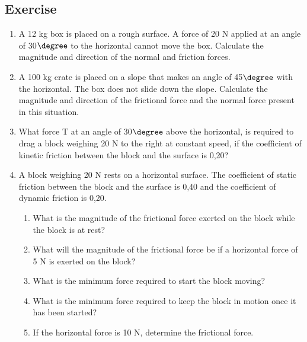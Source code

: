 \subsection{Exercise}
\begin{enumerate}
\item {A 12 kg box is placed on a rough surface. A force of 20 N applied at an angle of 30$\degree$ to the horizontal cannot move the box. Calculate the magnitude and direction of the normal and friction forces.}
\item {A 100 kg crate is placed on a slope that makes an angle of 45$\degree$ with the horizontal. The box does not slide down the slope. Calculate the magnitude and direction of the frictional force and the normal force present in this situation.}
\item {What force T at an angle of 30$\degree$ above the horizontal, is required to drag a block weighing 20 N to the right at constant speed, if the coefficient of kinetic friction between the block and the surface is 0,20?}
\item {A block weighing 20 N rests on a horizontal surface. The coefficient of static friction between the block and the surface is 0,40 and the coefficient of dynamic friction is 0,20. 
\begin{enumerate}
\item What is the magnitude of the frictional force exerted on the block while the block is at rest?
\item What will the magnitude of the frictional force be if a horizontal force of 5 N is exerted on the block?
\item What is the minimum force required to start the block moving?
\item What is the minimum force required to keep the block in motion once it has been started?
\item If the horizontal force is 10 N, determine the frictional force.
\end{enumerate}}


\end{enumerate}
